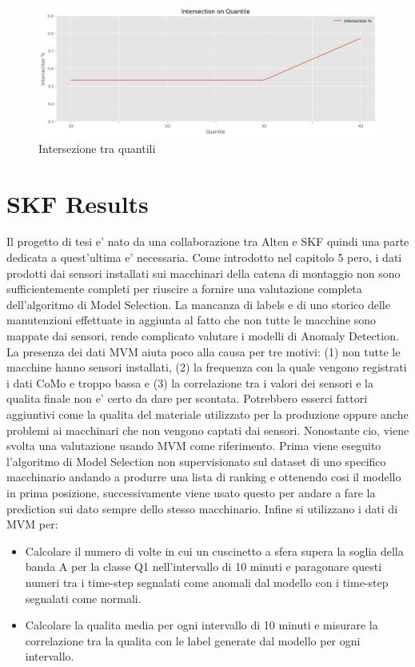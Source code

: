 \begin{figure}[t]
	\centering
	\includegraphics[width=14cm, scale=1]{images/4quantile}
	\caption{Intersezione tra quantili}
	\label{quantile-intersection}
		
\end{figure}


\newpage
\section{SKF Results}
Il progetto di tesi e' nato da una collaborazione tra Alten e SKF quindi una parte dedicata a quest'ultima e' necessaria. Come introdotto nel capitolo 5 pero, i dati prodotti dai sensori installati sui macchinari della catena di montaggio non sono sufficientemente completi per riuscire a fornire una valutazione completa dell'algoritmo di Model Selection. La mancanza di labels e di uno storico delle manutenzioni effettuate in aggiunta al fatto che non tutte le macchine sono mappate dai sensori, rende complicato valutare i modelli di Anomaly Detection. La presenza dei dati MVM aiuta poco alla causa per tre motivi: (1) non tutte le macchine hanno sensori installati, (2) la frequenza con la quale vengono registrati i dati CoMo e troppo bassa e (3) la correlazione tra i valori dei sensori e la qualita finale non e' certo da dare per scontata. Potrebbero esserci fattori aggiuntivi come la qualita del materiale utilizzato per la produzione oppure anche problemi ai macchinari che non vengono captati dai sensori. 
Nonostante cio, viene svolta una valutazione usando MVM come riferimento. Prima viene eseguito l'algoritmo di Model Selection non supervisionato sul dataset di uno specifico macchinario andando a produrre una lista di ranking e ottenendo cosi il modello in prima posizione, successivamente viene usato questo per andare a fare la prediction sui dato sempre dello stesso macchinario. Infine si utilizzano i dati di MVM per:
\begin{itemize}
	\item Calcolare il numero di volte in cui un cuscinetto a sfera supera la soglia della banda A per la classe Q1 nell'intervallo di 10 minuti e paragonare questi numeri tra i time-step segnalati come anomali dal modello con i time-step segnalati come normali.
	\item Calcolare la qualita media per ogni intervallo di 10 minuti e misurare la correlazione tra la qualita con le label generate dal modello per ogni intervallo.
\end{itemize}

